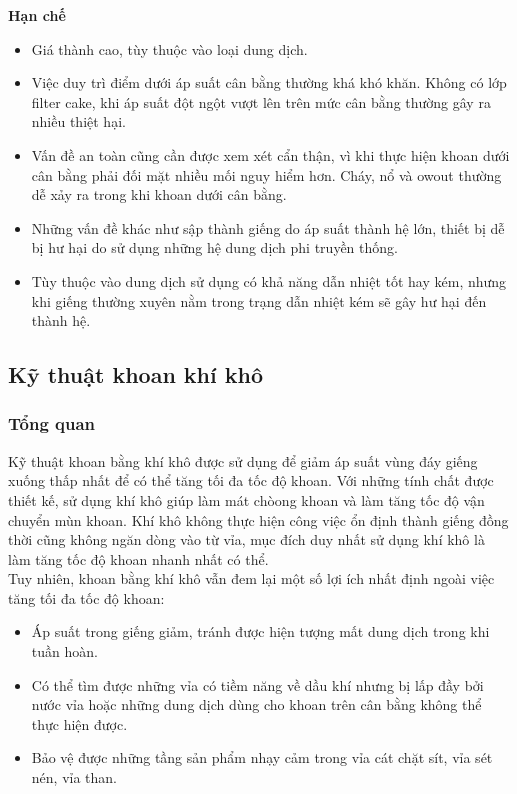 \documentclass[12pt,a4paper]{article}
\begin{document}
	\textbf{Hạn chế}
	\begin{itemize}
	\item Giá thành cao, tùy thuộc vào loại dung dịch.
	\item Việc duy trì điểm dưới áp suất cân bằng thường khá khó khăn. Không có lớp filter cake, khi áp suất đột ngột vượt lên trên mức cân bằng thường gây ra nhiều thiệt hại.
	\item Vấn đề an toàn cũng cần được xem xét cẩn thận, vì khi thực hiện khoan dưới cân bằng phải đối mặt nhiều mối nguy hiểm hơn. Cháy, nổ và owout thường dễ xảy ra trong khi khoan dưới cân bằng.
	\item Những vấn đề khác như sập thành giếng do áp suất thành hệ lớn, thiết bị dễ bị hư hại do sử dụng những hệ dung dịch phi truyền thống.
	\item Tùy thuộc vào dung dịch sử dụng có khả năng dẫn nhiệt tốt hay kém, nhưng khi giếng thường xuyên nằm trong trạng dẫn nhiệt kém sẽ gây hư hại đến thành hệ.
	\end{itemize}
\subsection{Kỹ thuật khoan khí khô}
\subsubsection{Tổng quan}
	Kỹ thuật khoan bằng khí khô\cite{rehm2013underbalanced} được sử dụng để giảm áp suất vùng đáy giếng xuống thấp nhất để có thể tăng tối đa tốc độ khoan. Với những tính chất được thiết kế, sử dụng khí khô giúp làm mát chòong khoan và làm tăng tốc độ vận chuyển mùn khoan. Khí khô không thực hiện công việc ổn định thành giếng đồng thời cũng không ngăn dòng vào từ vỉa, mục đích duy nhất sử dụng khí khô là làm tăng tốc độ khoan nhanh nhất có thể.\\
	Tuy nhiên, khoan bằng khí khô vẫn đem lại một số lợi ích nhất định ngoài việc tăng tối đa tốc độ khoan:
	\begin{itemize}
	\item{Áp suất trong giếng giảm, tránh được hiện tượng mất dung dịch trong khi tuần hoàn.}
	\item{Có thể tìm được những vỉa có tiềm năng về dầu khí nhưng bị lấp đầy bởi nước vỉa hoặc những dung dịch dùng cho khoan trên cân bằng không thể thực hiện được.}
	\item{Bảo vệ được những tầng sản phẩm nhạy cảm trong vỉa cát chặt sít, vỉa sét nén, vỉa than.}
	\end{itemize}
\end{document}
